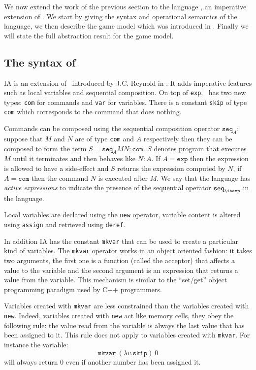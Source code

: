 We now extend the work of the previous section to the language
\ialgol, an imperative extension of \pcf. We start by giving the
syntax and operational semantics of the language, we then describe
the game model which was introduced in \cite{abramsky99full}.
Finally we will state the full abstraction result for the game
model.

\subsection{The syntax of \ialgol}
IA is an extension of \pcf\ introduced by J.C. Reynold in
\cite{Reynolds81}. It adds imperative features such as local
variables and sequential composition. On top of \texttt{exp}, \pcf\
has two new types: \texttt{com} for commands and \texttt{var} for
variables. There is a constant \texttt{skip} of type \texttt{com}
which corresponds to the command that does nothing.

Commands can be composed using the sequential composition operator
$\texttt{seq}_A$: suppose that $M$ and $N$ are of type \texttt{com}
and $A$ respectively then they can be composed to form the term $S =
\texttt{seq}_A M N : \texttt{com}$. $S$ denotes program that
executes $M$ until it terminates and then behaves like $N:A$. If $A
= \texttt{exp}$ then the expression is allowed to have a side-effect
and $S$ returns the expression computed by $N$, if $A =
\texttt{com}$ then the command $N$ is executed after $M$. We say
that the language has \emph{active expressions} to indicate the
presence of the sequential operator $\texttt{seq}_{\iaexp}$ in the
language.


Local variables are
declared using the \texttt{new} operator, variable content is altered
using \texttt{assign} and retrieved using \texttt{deref}.

In addition IA has the constant \texttt{mkvar} that can be used to
create a particular kind of variables. The \texttt{mkvar} operator
works in an object oriented fashion: it takes two arguments, the
first one is a function (called the acceptor) that affects a value
to the variable and the second argument is an expression that
returns a value from the variable. This mechanism is similar to
the ``set/get'' object programming paradigm used by C++ programmers.

Variables created with \texttt{mkvar} are less constrained than the
variables created with \texttt{new}. Indeed, variables created with
\texttt{new} act like memory cells, they obey the following rule:
the value read from the variable is always the last value that has
been assigned to it. This rule does not apply to variables created
with \texttt{mkvar}. For instance the variable:
$$\texttt{mkvar}\ (\lambda v.\texttt{skip})\ 0$$
will always return $0$ even if another number has been assigned it.


